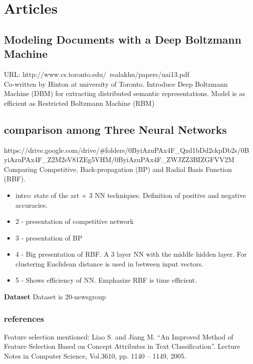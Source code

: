 



\section{Articles}
	\subsection {Modeling Documents with a Deep Boltzmann Machine}
		URL: http://www.cs.toronto.edu/~rsalakhu/papers/uai13.pdf \\

		Co-written by Hinton at university of Toronto. Introduce Deep Boltzmann Machine (DBM) for extracting distributed semantic representations. Model is as efficient as Restricted Boltzmann Machine (RBM) 



	\subsection{comparison among Three Neural Networks} 
		https://drive.google.com/drive/\#folders/0ByiAzuPAx4F\_Qzd1bDd2ckpDb2s/0ByiAzuPAx4F\_Z2M2eV81ZEg5VHM/0ByiAzuPAx4F\_ZWJZZ3BIZGFVV2M \\

		Comparing Competitive, Back-propagation (BP) and Radial Basis Function (RBF). 
		\begin{itemize}
			\item intro: state of the art + 3 NN techniques. Definition of positive and negative accuracies.
			\item 2 - presentation of competitive network
			\item 3 - presentation of BP
			\item 4 - Big presentation of RBF. A 3 layer NN with the middle hidden layer. For clustering Euclidean distance is used in between input vectors. 
			\item 5 - Shows efficiency of NN. Emphasize RBF is time efficient.
		\end{itemize}

		\textbf{Dataset}
		Dataset is 20-newsgroup

		\subsubsection{references}
		Feature selection mentioned: Liao S. and Jiang M. “An Improved Method of Feature Selection Based on Concept Attributes in Text Classification”. Lecture Notes in Computer Science, Vol.3610, pp. 1140 – 1149, 2005.

